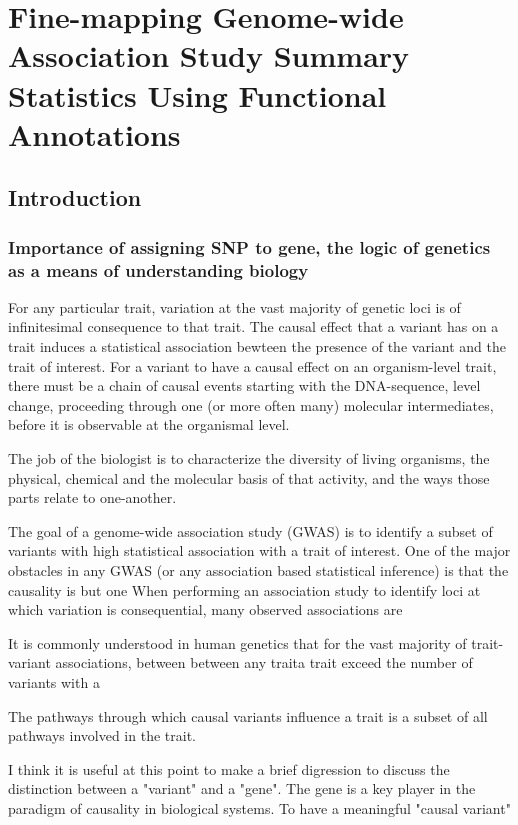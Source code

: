 \chapter{Fine-mapping Genome-wide Association Study Summary Statistics Using Functional Annotations}

\section*{Introduction}
\label{sec:org59556ac}

\subsection*{Importance of assigning SNP to gene, the logic of genetics as a means of understanding biology}
\label{sec:org1481578}

For any particular trait, variation at the vast majority of genetic loci is of infinitesimal consequence to that trait.  The causal
effect that a variant has on a trait induces a statistical association bewteen the presence of the variant and the trait of interest.
For a variant to have a causal effect on an organism-level trait, there must be a chain of causal events starting with the DNA-sequence,
 level change, proceeding through one (or more often many) molecular intermediates, before it is observable at the organismal level.  

The job of the biologist is to characterize the diversity of living organisms, the physical, chemical and the molecular basis of that activity, and the ways
 those parts relate to one-another.


 The goal of a genome-wide association study (GWAS) is to identify a subset of variants with high statistical association with a trait of interest.
One of the major obstacles in any GWAS (or any association based statistical inference) is that the causality is but one   When
performing an association study to identify loci at which variation is consequential, many observed associations are 

It is commonly understood in human genetics that for the vast majority of trait-variant associations, 
 between between any traita trait exceed the number of variants with a 

The pathways through which causal variants influence a trait is a subset of all pathways involved in the trait.  


I think it is useful at this point to make a brief digression to discuss the distinction between a "variant" and a "gene". The gene
is a key player in the paradigm of causality in biological systems. To have a meaningful "causal variant"

